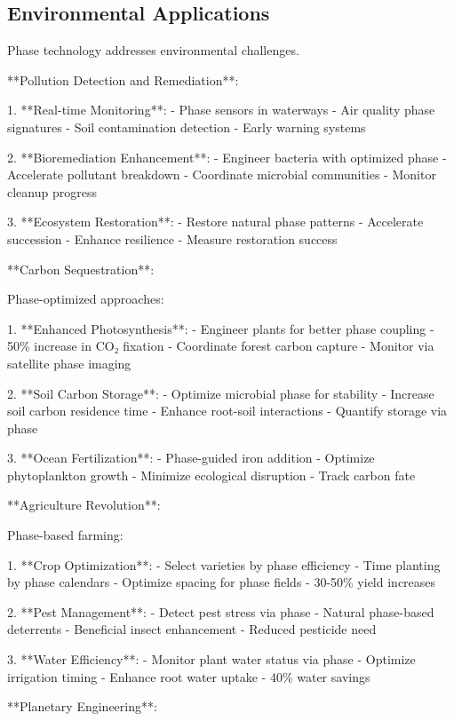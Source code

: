 \documentclass[12pt,a4paper]{report}
\begin{document}
\subsection{Environmental Applications}

Phase technology addresses environmental challenges.

**Pollution Detection and Remediation**:

1. **Real-time Monitoring**:
   - Phase sensors in waterways
   - Air quality phase signatures
   - Soil contamination detection
   - Early warning systems

2. **Bioremediation Enhancement**:
   - Engineer bacteria with optimized phase
   - Accelerate pollutant breakdown
   - Coordinate microbial communities
   - Monitor cleanup progress

3. **Ecosystem Restoration**:
   - Restore natural phase patterns
   - Accelerate succession
   - Enhance resilience
   - Measure restoration success

**Carbon Sequestration**:

Phase-optimized approaches:

1. **Enhanced Photosynthesis**:
   - Engineer plants for better phase coupling
   - 50\% increase in CO₂ fixation
   - Coordinate forest carbon capture
   - Monitor via satellite phase imaging

2. **Soil Carbon Storage**:
   - Optimize microbial phase for stability
   - Increase soil carbon residence time
   - Enhance root-soil interactions
   - Quantify storage via phase

3. **Ocean Fertilization**:
   - Phase-guided iron addition
   - Optimize phytoplankton growth
   - Minimize ecological disruption
   - Track carbon fate

**Agriculture Revolution**:

Phase-based farming:

1. **Crop Optimization**:
   - Select varieties by phase efficiency
   - Time planting by phase calendars
   - Optimize spacing for phase fields
   - 30-50\% yield increases

2. **Pest Management**:
   - Detect pest stress via phase
   - Natural phase-based deterrents
   - Beneficial insect enhancement
   - Reduced pesticide need

3. **Water Efficiency**:
   - Monitor plant water status via phase
   - Optimize irrigation timing
   - Enhance root water uptake
   - 40\% water savings

**Planetary Engineering**:
\end{document}
